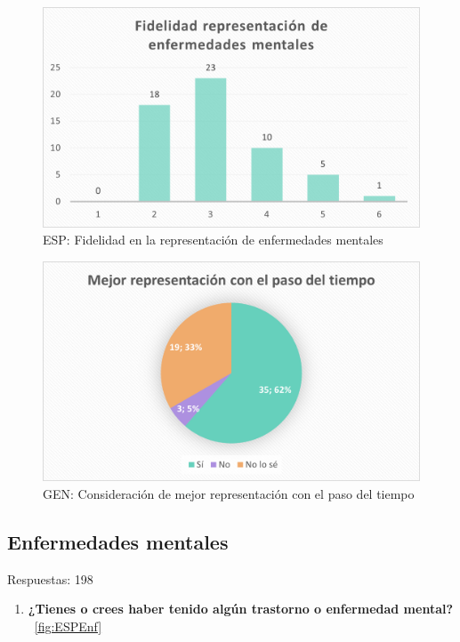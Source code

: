 \documentclass[12pt, a4paper,twoside,titlepage]{book}
\begin{document}
\begin{figure}
    \centering
    \includegraphics[width=.8\linewidth]{ANEXO ESP/18AnexESPDife}
    \caption{ESP: Fidelidad en la representación de enfermedades mentales}
    \label{fig:ESPFidel}
\end{figure}

\begin{figure}
    \centering
    \includegraphics[width=.8\linewidth]{ANEXO ESP/19AnexESPMejor}
    \caption{GEN: Consideración de mejor representación con el paso del tiempo}
    \label{fig:ESPMejor}
\end{figure}





\subsection{Enfermedades mentales}
Respuestas: 198
\begin{enumerate}[label=\textbf{\arabic*}.]
     \item \textbf{¿Tienes o crees haber tenido algún trastorno o enfermedad mental? }\\
    ~\ref{fig:ESPEnf}
\end{enumerate}
\end{document}
